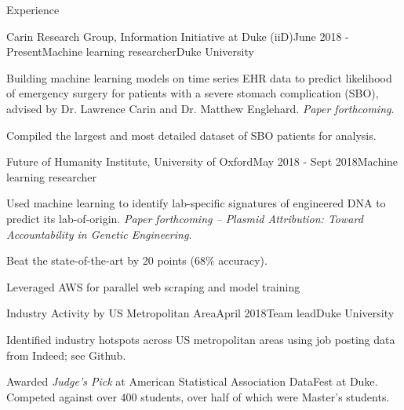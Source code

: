 \documentclass{resume} %
\begin{document}
\begin{rSection}{Experience}

\begin{rSubsection}{Carin Research Group, Information Initiative at Duke (iiD)}{June 2018 - Present}{Machine learning researcher}{Duke University}
\item Building machine learning models on time series EHR data to predict likelihood of emergency surgery for patients with a severe stomach complication (SBO), advised by Dr. Lawrence Carin and Dr. Matthew Englehard. \textit{Paper forthcoming}.
\item Compiled the largest and most detailed dataset of SBO patients for analysis.

\end{rSubsection}

\begin{rSubsection}{Future of Humanity Institute, University of Oxford}{May 2018 - Sept 2018}{Machine learning researcher}{}
\item Used machine learning to identify lab-specific signatures of engineered DNA to predict its lab-of-origin. \textit{Paper forthcoming -- Plasmid Attribution: Toward Accountability in Genetic Engineering}.
\item Beat the state-of-the-art by 20 points (68\% accuracy).
\item Leveraged AWS for parallel web scraping and model training
\end{rSubsection}


\begin{rSubsection}{Industry Activity by US Metropolitan Area}{April 2018}{Team lead}{Duke University}
\item Identified industry hotspots across US metropolitan areas using job posting data from Indeed; see Github.
\item Awarded \textit{Judge's Pick} at American Statistical Association DataFest at Duke. Competed against over 400 students, over half of which were Master's students.
\end{rSubsection}


\end{rSection}
\end{document}
